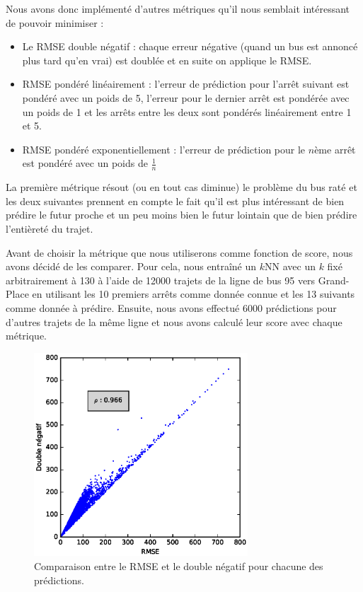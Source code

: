 \documentclass[letterpaper]{article}
\begin{document}
Nous avons donc implémenté d'autres métriques qu'il nous semblait intéressant de pouvoir minimiser :
\begin{itemize}
    \item Le RMSE double négatif : chaque erreur négative (quand un bus est annoncé plus tard qu'en vrai) est doublée et en suite on applique le RMSE.
    \item RMSE pondéré linéairement : l'erreur de prédiction pour l'arrêt suivant est pondéré avec un poids de 5, l'erreur pour le dernier arrêt est pondérée avec un poids de 1 et les arrêts entre les deux sont pondérés linéairement entre 1 et 5.
    \item RMSE pondéré exponentiellement : l'erreur de prédiction pour le $n$ème arrêt est pondéré avec un poids de $\frac{1}{n}$
\end{itemize}
\vspace{1em}

La première métrique résout (ou en tout cas diminue) le problème du bus raté et les deux suivantes prennent en compte le fait qu'il est plus intéressant de bien prédire le futur proche et un peu moins bien le futur lointain que de bien prédire l'entièreté du trajet.

Avant de choisir la métrique que nous utiliserons comme fonction de score, nous avons décidé de les comparer.
Pour cela, nous entraîné un $k$NN avec un $k$ fixé arbitrairement à 130 à l'aide de 12000 trajets de la ligne de bus 95 vers Grand-Place en utilisant les 10 premiers arrêts comme donnée connue et les 13 suivants comme donnée à prédire. Ensuite, nous avons effectué 6000 prédictions pour d'autres trajets de la même ligne et nous avons calculé leur score avec chaque métrique.

\begin{figure}
   \centerline{\includegraphics[width=8cm]{metrics.eps}}
   \caption{\label{fig:rmse-vs-double}Comparaison entre le RMSE et le double négatif pour chacune des prédictions.}
\end{figure}
\end{document}
